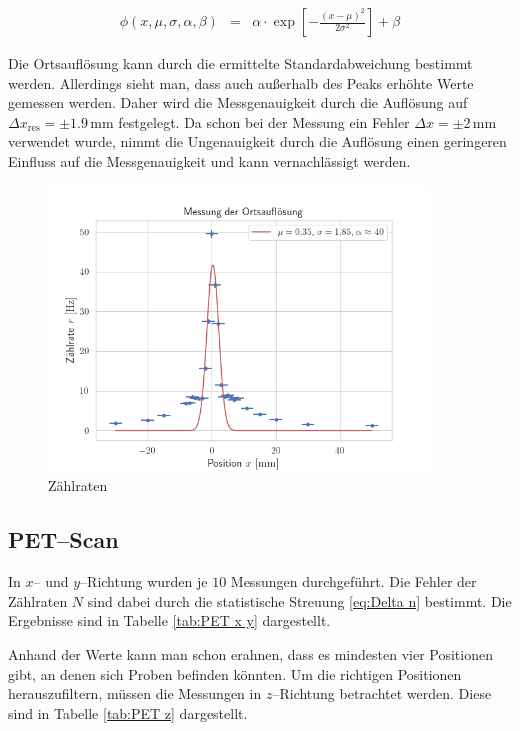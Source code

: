 \documentclass[12pt,a4paper]{scrartcl}
\numberwithin{equation}{section} %
\begin{document}
\begin{eqnarray}
    \phi(x, \mu, \sigma, \alpha, \beta) &=& \alpha\cdot \exp\left[- \frac{(x - \mu)^2}{2\sigma^2} \right] + \beta \label{eq:gauss-fit}
\end{eqnarray}

\noindent
Die Ortsauflösung kann durch die ermittelte Standardabweichung bestimmt werden. Allerdings sieht man, dass auch außerhalb des Peaks erhöhte Werte gemessen werden. Daher wird die Messgenauigkeit durch die Auflösung auf $\Delta x_\mathrm{res}=\pm 1.9\,\mathrm{mm}$ festgelegt. Da schon bei der Messung ein Fehler $\Delta x=\pm 2\,\mathrm{mm}$ verwendet wurde, nimmt die Ungenauigkeit durch die Auflösung einen geringeren Einfluss auf die Messgenauigkeit und kann vernachlässigt werden.

\begin{figure}[h]
	\centering
	\includegraphics[width=0.9\textwidth]{../media/B3.4/Ortsaufloesung_fit.png}
	\caption{Zählraten}
	\label{abb:zaehlrate}
\end{figure}

\clearpage
\hypertarget{petscan}{%
\subsection{PET--Scan}\label{petscan}}
In $x$-- und $y$--Richtung wurden je $10$ Messungen durchgeführt. Die Fehler der Zählraten $N$ sind dabei durch die statistische Streuung \eqref{eq:Delta n} bestimmt. Die Ergebnisse sind in Tabelle \ref{tab:PET x y} dargestellt.

Anhand der Werte kann man schon erahnen, dass es mindesten vier Positionen gibt, an denen sich Proben befinden könnten. Um die richtigen Positionen herauszufiltern, müssen die Messungen in $z$--Richtung betrachtet werden. Diese sind in Tabelle \ref{tab:PET z} dargestellt.
\end{document}

